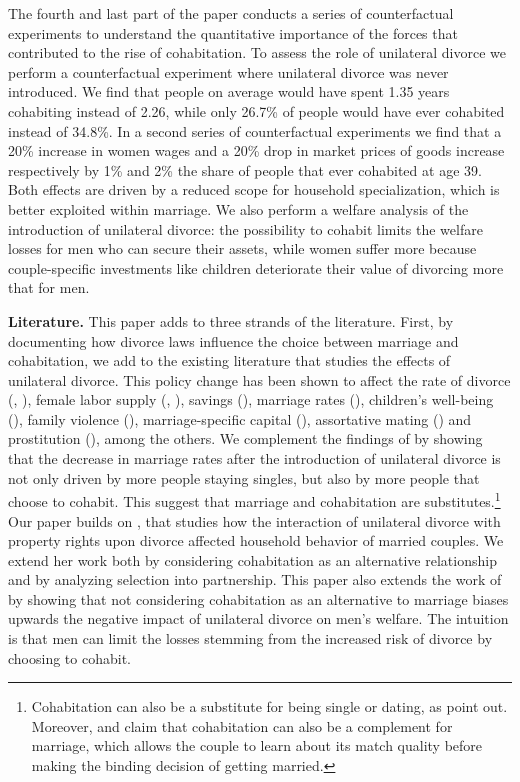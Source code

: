 \documentclass[12pt]{article}
\numberwithin{table}{section}
\begin{document}
The fourth and last part of the paper conducts a series of counterfactual experiments to understand the quantitative importance of the forces that contributed to the rise of cohabitation. To assess the role of unilateral divorce we perform a counterfactual experiment where unilateral divorce was never introduced. We find that people on average would have spent 1.35 years cohabiting instead of 2.26, while only 26.7\% of people would have ever cohabited instead of 34.8\%. In a second series of counterfactual experiments we find that a 20\% increase in women wages and a 20\% drop in market prices of goods increase respectively by 1\% and 2\% the share of people that ever cohabited at age 39. Both effects are driven by a reduced scope for household specialization, which is better exploited within marriage. We also perform a welfare analysis of the introduction of unilateral divorce: the possibility to cohabit limits the welfare losses for men who can secure their assets, while women suffer more because couple-specific investments like children deteriorate their value of divorcing more that for men.

\textbf{Literature.} This paper adds to three strands of the literature. First, by documenting how divorce laws influence the choice between marriage and cohabitation, we add to the existing literature that studies the effects of unilateral divorce. This policy change has been shown to affect the rate of divorce (\citealp{friedberg1998}, \citealp{wolfers2006}), female labor supply (\citealp{stevenson2008}, \citealp{voena2015}), savings (\citealp{voena2015}), marriage rates (\citealp{rasul2003,rasul2006}), children's well-being (\citealp{gruber2004}), family violence (\citealp{stevenson2006}), marriage-specific capital (\citealp{stevenson2007}), assortative mating (\citealp{reynoso2019}) and prostitution (\citealp{ciacci2017}), among the others. We complement the findings of \cite{rasul2003,rasul2006} by showing that the decrease in marriage rates after the introduction of unilateral divorce is not only driven by more people staying singles, but also by more people that choose to cohabit. This suggest that marriage and cohabitation are substitutes.\footnote{Cohabitation can also be a substitute for being single or dating, as \cite{rindfuss1990} point out. Moreover, \cite{blasutto2020} and \cite{brien2006} claim that cohabitation can also be a complement for marriage, which allows the couple to learn about its match quality before making the binding decision of getting married.} Our paper builds on \cite{voena2015}, that studies how the interaction of unilateral divorce with property rights upon divorce affected household behavior of married couples. We extend her work both by considering cohabitation as an alternative relationship and by analyzing selection into partnership. This paper also extends the work of \cite{fernandez2017} by showing that not considering cohabitation as an alternative to marriage biases upwards the negative impact of unilateral divorce on men's welfare. The intuition is that men can limit the losses stemming from the increased risk of divorce by choosing to cohabit.
\end{document}
